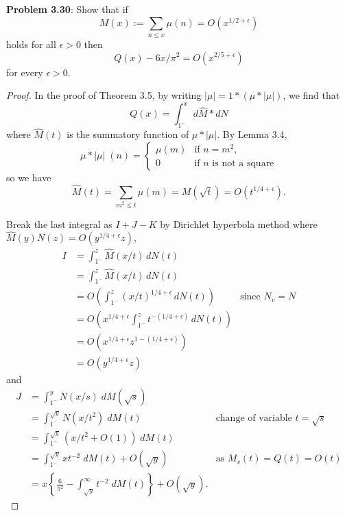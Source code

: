 \documentclass[12pt]{article}
\renewcommand{\O}[1]{O\left( #1 \right)}
\begin{document}
\fi

\textbf{Problem 3.30}: Show that if
$$M(x) := \sum_{n \leq x} \mu(n) = \O{ x^{1/2 + \epsilon} }$$
holds for all $\epsilon > 0$ then
$$Q(x) - 6x/\pi^2 = \O{ x^{2/5+\epsilon} }$$
for every $\epsilon > 0$.

\begin{proof}
\newcommand{\Mhat}{\widehat{M}}
In the proof of Theorem 3.5, by writing $|\mu| = 1 * (\mu * |\mu|)$, we find that
$$Q(x) = \int_{1^-}^x d\Mhat * dN$$
where $\Mhat(t)$ is the summatory function of $\mu * |\mu|$. By Lemma 3.4,
$$\mu * |\mu| \; (n) = \begin{cases}
\mu(m) &\text{if } n = m^2,\\
0 &\text{if } n \text{ is not a square}
\end{cases}$$
so we have
$$\Mhat(t) = \sum_{m^2 \leq t} \mu(m) = M(\sqrt{t}) = \O{ t^{1/4 + \epsilon} }.$$

Break the last integral as $I + J - K$ by Dirichlet hyperbola method where $\Mhat(y) N(z) = \O{ y^{1/4 + \epsilon} z }$,
\begin{align*}
I &= \int_{1^-}^z \Mhat(x/t) \, dN(t) \\
&= \int_{1^-}^z \Mhat(x/t) \, dN(t) \\
&= \O{ \int_{1^-}^z (x/t)^{1/4 + \epsilon} \, dN(t) } &\text{since } N_v = N \\
&= \O{ x^{1/4 + \epsilon} \int_{1^-}^z t^{-(1/4 + \epsilon)} \, dN(t) } \\
&= \O{ x^{1/4 + \epsilon} z^{1-(1/4 + \epsilon)} } \\
&= \O{ y^{1/4 + \epsilon} z }
\end{align*}
and
\begin{align*}
J &= \int_{1^-}^y N(x/s) \; d M(\sqrt{s})\\
&= \int_{1^-}^{\sqrt y} N(x/t^2) \; d M(t) &\text{change of variable } t = \sqrt{s}\\
&= \int_{1^-}^{\sqrt y} (x/t^2 + \O{ 1 }) \; d M(t)\\
&= \int_{1^-}^{\sqrt y} x t^{-2} \; dM(t) + \O{ \sqrt y } &\text{as }M_v(t) = Q(t) = \O{ t }\\
&= x \left\{\frac{6}{\pi^2} - \int_{\sqrt y}^{\infty} t^{-2} \; dM(t)\right\} + \O{ \sqrt y }.
\end{align*}


\end{proof}
\end{document}
